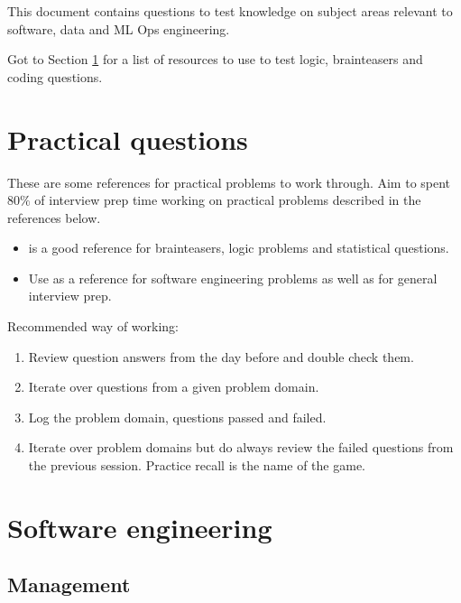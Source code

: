 This document contains questions to test knowledge on subject areas relevant to software, data and ML Ops engineering.

Got to Section \ref{sec:practical_problems} for a list of resources to use to test logic, brainteasers and coding questions.

\tableofcontents

\section{Practical questions} \label{sec:practical_problems}

These are some references for practical problems to work through. Aim to spent $80\%$ of interview prep time working on practical problems described in the references below.
\begin{itemize}
    \item \cite{hots} is a good reference for brainteasers, logic problems and statistical questions.
    \item Use \cite{ctci} as a reference for software engineering problems as well as for general interview prep.
\end{itemize}

Recommended way of working:
\begin{enumerate}
    \item Review question answers from the day before and double check them.
    \item Iterate over questions from a given problem domain.
    \item Log the problem domain, questions passed and failed.
    \item Iterate over problem domains but do always review the failed questions from the previous session. Practice recall is the name of the game.
\end{enumerate}

\section{Software engineering}

\subsection{Management}

